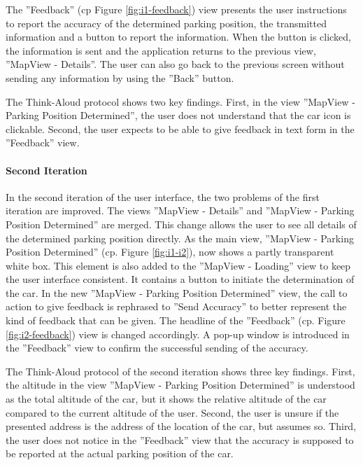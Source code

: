 The ''Feedback'' (cp Figure \ref{fig:i1-feedback}) view presents the user instructions to report the accuracy of the determined parking position, the transmitted information and a button to report the information. When the button is clicked, the information is sent and the application returns to the previous view, ''MapView - Details''. The user can also go back to the previous screen without sending any information by using the ''Back'' button.


The Think-Aloud protocol shows two key findings. First, in the view ''MapView - Parking Position Determined'', the user does not understand that the car icon is clickable. Second, the user expects to be able to give feedback in text form in the ''Feedback'' view.

\paragraph{Second Iteration}

In the second iteration of the user interface, the two problems of the first iteration are improved. The views ''MapView - Details'' and ''MapView - Parking Position Determined'' are merged. This change allows the user to see all details of the determined parking position directly. As the main view, ''MapView - Parking Position Determined'' (cp. Figure \ref{fig:i1-i2}), now shows a partly transparent white box. This element is also added to the ''MapView - Loading'' view to keep the user interface consistent. It contains a button to initiate the determination of the car. 
In the new ''MapView - Parking Position Determined'' view, the call to action to give feedback is rephrased to ''Send Accuracy'' to better represent the kind of feedback that can be given. The headline of the ''Feedback'' (cp. Figure \ref{fig:i2-feedback}) view is changed accordingly. A pop-up window is introduced in the ''Feedback'' view to confirm the successful sending of the accuracy.

The Think-Aloud protocol of the second iteration shows three key findings. First, the altitude in the view ''MapView - Parking Position Determined'' is understood as the total altitude of the car, but it shows the relative altitude of the car compared to the current altitude of the user. Second, the user is unsure if the presented address is the address of the location of the car, but assumes so. Third, the user does not notice in the ''Feedback'' view that the accuracy is supposed to be reported at the actual parking position of the car.


